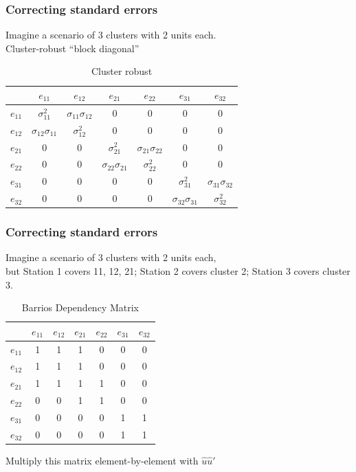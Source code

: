 \documentclass{beamer}
\begin{document}
\begin{frame}
\frametitle{Correcting standard errors}
Imagine a scenario of 3 clusters with 2 units each.\\
Cluster-robust ``block diagonal''
\begin{table}[h]
\caption{Cluster robust}
\begin{tabular}{ c|c c c c c c|}
 		 &  $e_{11}$ 		& $e_{12}$ 		& $e_{21}$ & $e_{22}$ & $e_{31}$ & $e_{32}$\\ \hline
$e_{11}$ & $\sigma_{11}^2$ & $\sigma_{11}\sigma_{12}$ 	   & 0 		  & 0 		 & 0 		& 0 		\\
$e_{12}$ & $\sigma_{12}\sigma_{11}$ & $\sigma_{12}^2$ & 0		  & 0 		 & 0 		& 0 		\\
$e_{21}$ & 0  		 & 0 	   & $\sigma_{21}^2$ & $\sigma_{21}\sigma_{22}$	& 0 		& 0 		\\
$e_{22}$ & 0			 & 0 	   & $\sigma_{22}\sigma_{21}$& $\sigma_{22}^2$ & 0 		& 0 		\\
$e_{31}$ & 0			 & 0 	   & 0 		  & 0 		 & $\sigma_{31}^2$ & $\sigma_{31}\sigma_{32}$\\
$e_{32}$ & 0			 & 0 	   & 0 		  & 0 		 & $\sigma_{32}\sigma_{31}$& $\sigma_{32}^2$ \\ \hline
\end{tabular}
\end{table}
\end{frame}

\begin{frame}
\frametitle{Correcting standard errors}
Imagine a scenario of 3 clusters with 2 units each, \\
but Station 1 covers 11, 12, 21; Station 2 covers cluster 2; Station 3 covers cluster 3.
\begin{table}[h]
\caption{Barrios Dependency Matrix}
\begin{tabular}{ c|c c c c c c|}
 		 &  $e_{11}$ 		& $e_{12}$ 		& $e_{21}$ & $e_{22}$ & $e_{31}$ & $e_{32}$\\ \hline
$e_{11}$ & 1 		& 1	   & 1		  & 0 		 & 0 		& 0 		\\
$e_{12}$ & 1  		& 1 & 1 		  & 0 		 & 0 		& 0 		\\
$e_{21}$ & 1  		& 1	   & 1 & 1 		 & 0 		& 0 		\\
$e_{22}$ & 0			 & 0 	   & 1 & 1 & 0 		& 0 		\\
$e_{31}$ & 0			 & 0 	   & 0 		  & 0 		 & 1 & 1 \\
$e_{32}$ & 0			 & 0 	   & 0 		  & 0 		 & 1 & 1 \\ \hline
\end{tabular}
\end{table}
Multiply this matrix element-by-element with $\hat{u}\hat{u}'$
\end{frame}
\end{document}
